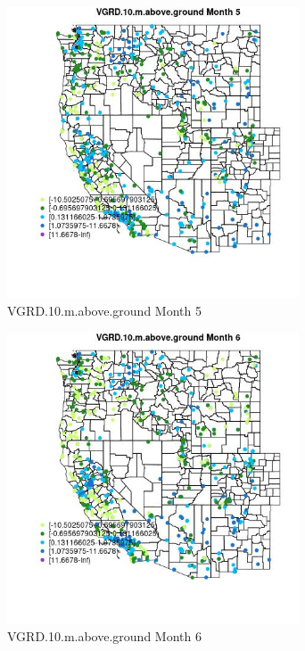 \begin{figure} 
\centering  
\includegraphics[width=0.77\textwidth]{Code_Outputs/Report_ML_input_PM25_Step4_part_e_de_duplicated_aves_compiled_2019-05-14wNAs_MapObsMo5VGRD10maboveground.jpg} 
\caption{\label{fig:Report_ML_input_PM25_Step4_part_e_de_duplicated_aves_compiled_2019-05-14wNAsMapObsMo5VGRD10maboveground}VGRD.10.m.above.ground Month 5} 
\end{figure} 
 

\begin{figure} 
\centering  
\includegraphics[width=0.77\textwidth]{Code_Outputs/Report_ML_input_PM25_Step4_part_e_de_duplicated_aves_compiled_2019-05-14wNAs_MapObsMo6VGRD10maboveground.jpg} 
\caption{\label{fig:Report_ML_input_PM25_Step4_part_e_de_duplicated_aves_compiled_2019-05-14wNAsMapObsMo6VGRD10maboveground}VGRD.10.m.above.ground Month 6} 
\end{figure} 
 


